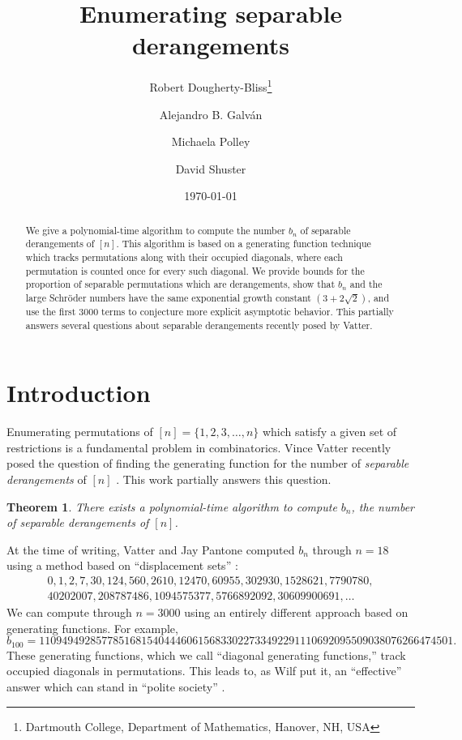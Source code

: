 \documentclass{article}
\title{Enumerating separable derangements}
\author{Robert Dougherty-Bliss\thanks{Dartmouth College, Department of Mathematics, Hanover, NH, USA} \and Alejandro B. Galv\'an\footnotemark[1] \and Michaela Polley\footnotemark[1] \and David Shuster\footnotemark[1]}
\date{\today}
\theoremstyle{plain}
\newtheorem{theorem}{Theorem}
\theoremstyle{definition}
\theoremstyle{plain}
\begin{document}
\maketitle


\begin{abstract}
    \noindent We give a polynomial-time algorithm to compute the number $b_n$ of
    separable derangements of $[n]$. This algorithm is based on a generating
    function technique which tracks permutations along with their occupied
    diagonals, where each permutation is counted once for every such diagonal.
    We provide bounds for the proportion of separable permutations which are
    derangements, show that $b_n$ and the large Schr\"oder numbers have the same
    exponential growth constant $(3 + 2 \sqrt{2})$, and use the first 3000 terms
    to conjecture more explicit asymptotic behavior. This partially answers
    several questions about separable derangements recently posed by Vatter.
\end{abstract}

\section{Introduction}

Enumerating permutations of $[n] = \{1, 2, 3, \dots, n\}$ which satisfy a given
set of restrictions is a fundamental problem in combinatorics. Vince Vatter
recently posed the question of finding the generating function for the number of
\emph{separable derangements} of $[n]$ \cite[Problem 4.4]{Vatter2026Problems}.
This work partially answers this question.

\begin{theorem}
    There exists a polynomial-time algorithm to compute $b_n$, the number of
    separable derangements of $[n]$.
\end{theorem}

At the time of writing, Vatter and Jay Pantone computed $b_n$ through $n = 18$
using a method based on ``displacement sets'' \cite[sec.~4]{Vatter2026Problems}:
\begin{align*}
    0, 1, 2, 7, 30, 124, 560, 2610, 12470, 60955, 302930, 1528621, 7790780, \\
    40202007, 208787486, 1094575377, 5766892092, 30609900691, \dots
\end{align*}
We can compute through $n = 3000$ using an entirely different approach based on
generating functions. For example,
\begin{equation*}
    b_{100}
    =
    1109494928577851681540444606156833022733492291110692095509038076266474501.
\end{equation*}
These generating functions, which we call ``diagonal generating functions,''
track occupied diagonals in permutations. This leads to, as Wilf put it,
an ``effective'' answer which can stand in ``polite society'' \cite{Wilf1982}.
\end{document}
